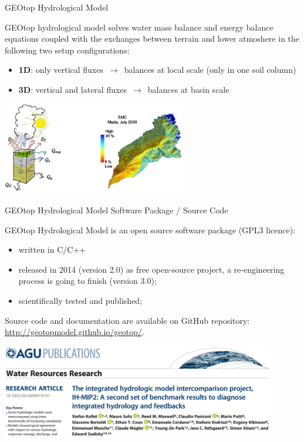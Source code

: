 \documentclass[ignorenonframetext,]{beamer}
\providecommand{\tightlist}{%
  \setlength{\itemsep}{0pt}\setlength{\parskip}{0pt}}
\begin{document}
\begin{frame}{GEOtop Hydrological Model}

GEOtop hydrological model solves water mass balance and energy balance
equations coupled with the exchanges between terrain and lower atmoshere
in the following two setup configurations:

\begin{itemize}
\item
  \textbf{1D}: only vertical fluxes \(\,\to\,\) balances at local scale
  (only in one soil column)
\item
  \textbf{3D}: vertical and lateral fluxes \(\,\to\,\) balances at basin
  scale
\end{itemize}

\includegraphics[width=0.60000\textwidth]{resources/images/geotop_ET_SWC.png}\\

\end{frame}

\begin{frame}{GEOtop Hydrological Model Software Package / Source Code}

GEOtop Hydrological Model is an open source software package (GPL3
licence):

\begin{itemize}
\tightlist
\item
  written in C/C++
\item
  released in 2014 (version 2.0) as free open-source project, a
  re-engineering process is going to finish (version 3.0);
\item
  scientifically tested and published;
\end{itemize}

Source code and documentation are available on GitHub repository:
\url{http://geotopmodel.github.io/geotop/}.

\includegraphics[width=0.90000\textwidth]{resources/images/geotop_paper_2017.png}\\

\end{frame}
\end{document}
